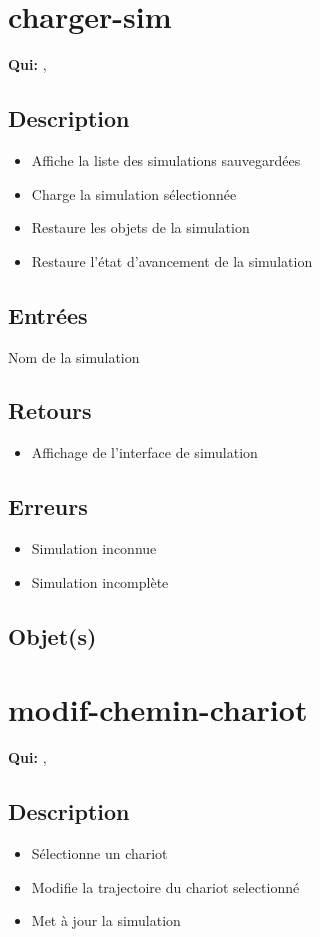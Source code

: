\section{charger-sim}
	\textbf{Qui:} \urt, \us

	\subsection{Description}
	\begin{itemize}
		\item Affiche la liste des simulations sauvegardées
		\item Charge la simulation sélectionnée
		\item Restaure les objets de la simulation
		\item Restaure l'état d'avancement de la simulation
	\end{itemize}

	\subsection{Entrées}
		Nom de la simulation

	\subsection{Retours}
	\begin{itemize}
		\item Affichage de l'interface de simulation
	\end{itemize}

	\subsection{Erreurs}
	\begin{itemize}
		\item Simulation inconnue \fatal
		\item Simulation incomplète \warning
	\end{itemize}

	\subsection{Objet(s)}
		\allobjs

\section{modif-chemin-chariot}
	\textbf{Qui:} \urt, \us

	\subsection{Description}
	\begin{itemize}
		\item Sélectionne un chariot
		\item Modifie la trajectoire du chariot selectionné
		\item Met à jour la simulation
	\end{itemize}

